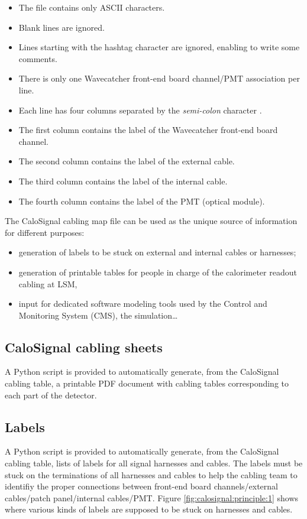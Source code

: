 \begin{itemize}
\item The file contains only ASCII characters.
\item Blank lines are ignored.
\item Lines starting with the hashtag character \fbox{\texttt{\#}} are
  ignored, enabling to write some comments.
\item  There  is  only  one Wavecatcher  front-end  board  channel/PMT
  association per line.
\item Each  line has four  columns separated by  the \emph{semi-colon}
  character \fbox{\texttt{;}}.
\item The first column contains the label of the Wavecatcher front-end
  board channel.
\item The second column contains the label of the external cable.
\item The third column contains the label of the internal cable.
\item  The  fourth column  contains  the  label  of the  PMT  (optical
  module).
\end{itemize}

\par\noindent  The CaloSignal  cabling map  file  can be  used as  the
unique source of information for different purposes:
\begin{itemize}
\item generation of labels to be stuck on external and internal cables
  or harnesses;
\item  generation of  printable tables  for  people in  charge of  the
  calorimeter readout cabling at LSM,
\item input for dedicated software  modeling tools used by the Control
  and Monitoring System (CMS), the simulation\dots
\end{itemize}


\subsection{CaloSignal cabling sheets}


A  Python  script is  provided  to  automatically generate,  from  the
CaloSignal cabling table, a printable PDF document with cabling tables
corresponding to each part of the detector.

\subsection{Labels}

A  Python  script is  provided  to  automatically generate,  from  the
CaloSignal cabling table, lists of labels for all signal harnesses and
cables.  The labels must be stuck on the terminations of all harnesses
and  cables  to  help  the   cabling  team  to  identifiy  the  proper
connections  between  front-end board  channels/external  cables/patch
panel/internal  cables/PMT.   Figure  \ref{fig:calosignal:principle:1}
shows  where various  kinds  of labels  are supposed  to  be stuck  on
harnesses and cables.

